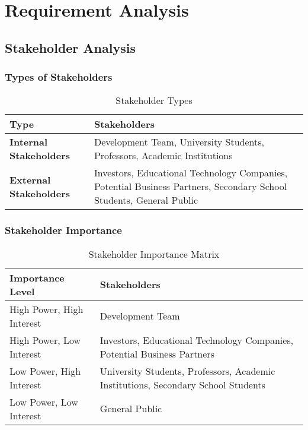 \chapter{Requirement Analysis}
\label{chap:requirement-analysis}

\section{Stakeholder Analysis}
\label{section:stakeholder-analysis}
% 

\subsection{Types of Stakeholders}

\begin{table}[ht]
    \centering
    \begin{tabular}[t]{ll}
        \hline
        \textbf{Type} & \textbf{Stakeholders} \\ 
        \hline
        \textbf{Internal Stakeholders} & Development Team, University Students, Professors, Academic Institutions \\ 
        \hline
        \textbf{External Stakeholders} & Investors, Educational Technology Companies, Potential Business Partners, Secondary School Students, General Public \\ 
        \hline
    \end{tabular}
    \caption{Stakeholder Types}
    \label{tab:stakeholder-types}
\end{table}

\subsection{Stakeholder Importance}

\begin{table}[ht]
    \centering
    \begin{tabular}[t]{ll}
        \hline
        \textbf{Importance Level} & \textbf{Stakeholders} \\ 
        \hline
        High Power, High Interest & Development Team \\ 
        \hline
        High Power, Low Interest & Investors, Educational Technology Companies, Potential Business Partners \\ 
        \hline
        Low Power, High Interest & University Students, Professors, Academic Institutions, Secondary School Students \\ 
        \hline
        Low Power, Low Interest & General Public \\ 
        \hline
    \end{tabular}
    \caption{Stakeholder Importance Matrix}
    \label{tab:stakeholder-importance}
\end{table}

